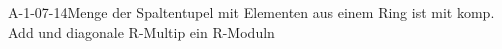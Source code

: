 
\begin{EXA}{A-1-07-14}{Menge der Spaltentupel mit Elementen aus einem Ring ist mit komp. Add und diagonale R-Multip ein R-Moduln}
\end{EXA}
